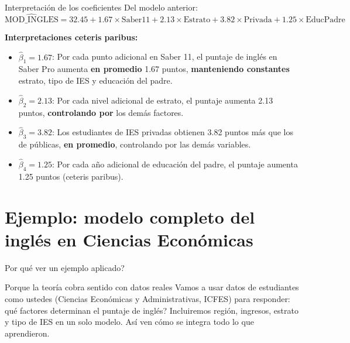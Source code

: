 \documentclass[aspectratio=169, 11pt]{beamer}
\begin{document}
\begin{frame}{Interpretación de los coeficientes}
Del modelo anterior:
\[
\widehat{\text{MOD\_INGLES}} = 32.45 + 1.67 \times \text{Saber11} + 2.13 \times \text{Estrato} + 3.82 \times \text{Privada} + 1.25 \times \text{EducPadre}
\]

\vspace{0.2cm}
\textbf{Interpretaciones ceteris paribus:}
\begin{itemize}
  \item $\hat{\beta}_1 = 1.67$: Por cada punto adicional en Saber 11, el puntaje de inglés en Saber Pro aumenta \textbf{en promedio} 1.67 puntos, \textbf{manteniendo constantes} estrato, tipo de IES y educación del padre.

  \item $\hat{\beta}_2 = 2.13$: Por cada nivel adicional de estrato, el puntaje aumenta 2.13 puntos, \textbf{controlando por} los demás factores.

  \item $\hat{\beta}_3 = 3.82$: Los estudiantes de IES privadas obtienen 3.82 puntos más que los de públicas, \textbf{en promedio}, controlando por las demás variables.

  \item $\hat{\beta}_4 = 1.25$: Por cada año adicional de educación del padre, el puntaje aumenta 1.25 puntos (ceteris paribus).
\end{itemize}
\end{frame}

\section{Ejemplo: modelo completo del inglés en Ciencias Econ\'omicas}

\begin{frame}{\textquestiondown{}Por qu\'e ver un ejemplo aplicado?}
\begin{exampleblock}{Porque la teor\'ia cobra sentido con datos reales}
\small
Vamos a usar datos de estudiantes como ustedes (Ciencias Econ\'omicas y Administrativas, ICFES) para responder: \textquestiondown{}qu\'e factores determinan el puntaje de ingl\'es? Incluiremos regi\'on, ingresos, estrato y tipo de IES en un solo modelo. As\'i ven c\'omo se integra todo lo que aprendieron.
\end{exampleblock}
\end{frame}
\end{document}
